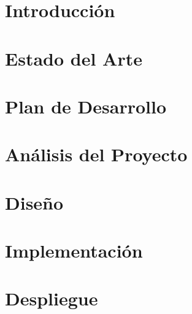 \documentclass[openright,twoside,10pt]{book}
\begin{document}
\chapter{Introducción}\label{cap.introduccion}


\chapter{Estado del Arte}\label{cap.arte}


\chapter{Plan de Desarrollo}\label{cap.desarrollo}


\chapter{Análisis del Proyecto}\label{cap.analisis}


\chapter{Diseño}
\label{cap.diseño}


\chapter{Implementación}\label{cap.implementation}


\chapter{Despliegue}\label{cap.deploy}

%


%

\end{document}
